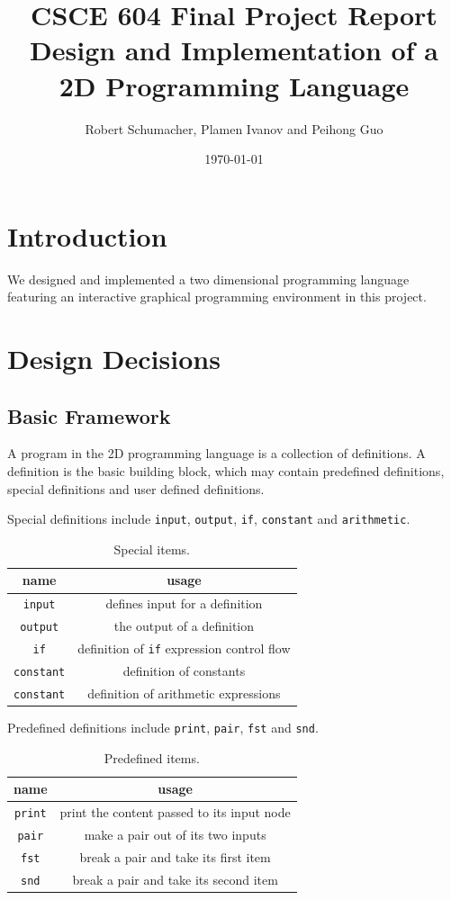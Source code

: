 \documentclass[12pt,UTF8,a4]{article}
\title{CSCE 604 Final Project Report \\ Design and Implementation of a 2D Programming Language}
\author{Robert Schumacher, Plamen Ivanov and Peihong Guo}
\date{\today}
\newcommand{\code}[1]{\texttt{#1}}
\begin{document}
\maketitle
\singlespacing

\section{Introduction}
We designed and implemented a two dimensional programming language featuring an interactive graphical programming environment in this project.

\section{Design Decisions}
\subsection{Basic Framework}
A program in the 2D programming language is a collection of definitions. A definition is the basic building block, which may contain predefined definitions, special definitions and user defined definitions.

Special definitions include \code{input}, \code{output}, \code{if}, \code{constant} and \code{arithmetic}.
\begin{table}[h]
\center
\begin{tabular}{c|c}
\hline
name & usage \\
\hline
\code{input} & defines input for a definition\\
\code{output} & the output of a definition\\
\code{if} & definition of \code{if} expression control flow \\
\code{constant} & definition of constants \\
\code{constant} & definition of arithmetic expressions \\
\hline
\end{tabular}
\caption{Special items.}\label{tab:sitems}
\end{table}

Predefined definitions include \code{print}, \code{pair}, \code{fst} and \code{snd}.
\begin{table}[h]
\center
\begin{tabular}{c|c}
\hline
name & usage \\
\hline
\code{print} & print the content passed to its input node\\
\code{pair} & make a pair out of its two inputs\\
\code{fst} & break a pair and take its first item \\
\code{snd} & break a pair and take its second item \\
\hline
\end{tabular}
\caption{Predefined items.}\label{tab:pitems}
\end{table}
\end{document}
